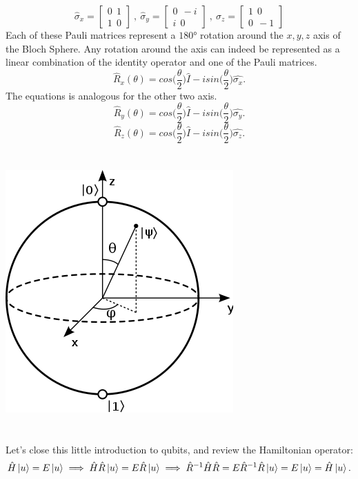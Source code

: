 \documentclass{article}
\begin{document}
$$\hat{\sigma}_x = \begin{bmatrix}
    0 \ \  1 \\ 1 \ \ 0
\end{bmatrix} \ , \ \hat{\sigma}_y =\begin{bmatrix}
    0 \ \ -i \\ i \  \ 0
\end{bmatrix} \ , \ \hat{\sigma}_z = \begin{bmatrix}
    1 \ \  0 \\ 0 \ \ -1
\end{bmatrix} $$
Each of these Pauli matrices represent a $180$° rotation around the $x,y,z$ axis of the Bloch Sphere. Any rotation around the axis can indeed be represented as a linear combination of the identity operator and one of the Pauli matrices.
$$\hat{R}_x(\theta)= cos\biggl(\frac{\theta}{2} \biggl) \hat{I} - i sin \biggl(\frac{\theta}{2} \biggl) \hat{\sigma_x}.$$
The equations is analogous for the other two axis.
$$\hat{R}_y(\theta)= cos\biggl(\frac{\theta}{2} \biggl) \hat{I} - i sin \biggl(\frac{\theta}{2} \biggl) \hat{\sigma_y}.$$
$$\hat{R}_z(\theta)= cos\biggl(\frac{\theta}{2} \biggl) \hat{I} - i sin \biggl(\frac{\theta}{2} \biggl) \hat{\sigma_z}.$$
\\ \\ 
\includegraphics[scale=0.6]{Bloch_sphere.svg.png} \\ \\  \\ 
Let's close this little introduction to qubits, and review the Hamiltonian operator: 
$$\hat{H}\ket{u} = E\ket{u} \implies \hat{H}\hat{R} \ket{u} = E\hat{R}\ket{u} \implies \hat{R}^{-1} \hat{H}\hat{R} = E \hat{R}^{-1}\hat{R}\ket{u} = E\ket{u} = \hat{H} \ket{u}.$$
\end{document}
